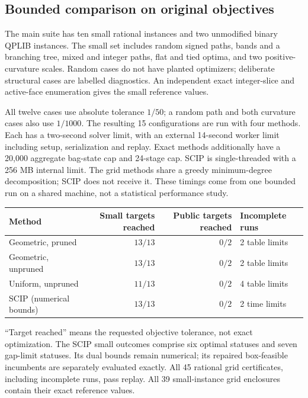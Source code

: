 \subsection{Bounded comparison on original objectives}
The main suite has ten small rational instances and two unmodified binary
QPLIB instances. The small set includes random signed paths, bands and a
branching tree, mixed and integer paths, flat and tied optima, and two
positive-curvature scales. Random cases do not have planted optimizers;
deliberate structural cases are labelled diagnostics. An independent exact
integer-slice and active-face enumeration gives the small reference values.

All twelve cases use absolute tolerance $1/50$; a random path and both
curvature cases also use $1/1000$. The resulting 15 configurations are
run with four methods. Each has a two-second solver limit, with an
external 14-second worker limit including setup, serialization and replay.
Exact methods additionally have a 20,000 aggregate bag-state cap and
24-stage cap. SCIP is single-threaded with a 256 MB internal limit.
The grid methods share a greedy minimum-degree decomposition; SCIP does
not receive it. These timings come from one bounded run on a shared
machine, not a statistical performance study.

\begin{center}
\begin{tabular}{lrrl}
\toprule
Method & Small targets reached & Public targets reached & Incomplete runs\\
\midrule
Geometric, pruned & $13/13$ & $0/2$ & 2 table limits\\
Geometric, unpruned & $13/13$ & $0/2$ & 2 table limits\\
Uniform, unpruned & $11/13$ & $0/2$ & 4 table limits\\
SCIP (numerical bounds) & $13/13$ & $0/2$ & 2 time limits\\
\bottomrule
\end{tabular}
\end{center}

``Target reached'' means the requested objective tolerance, not exact
optimization. The SCIP small outcomes comprise six optimal statuses and
seven gap-limit statuses. Its dual bounds remain numerical; its repaired
box-feasible incumbents are separately evaluated exactly. All 45 rational
grid certificates, including incomplete runs, pass replay. All 39
small-instance grid enclosures contain their exact reference values.


